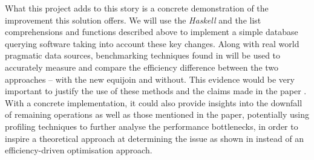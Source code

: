  What this project adds to this story is a concrete demonstration of the improvement this solution offers.
 We will use the \emph{Haskell} and the list comprehensions and functions described above to implement a simple database querying software taking into account these key changes. Along with real world pragmatic data sources, benchmarking techniques found in  will be used to accurately measure and compare the efficiency difference between the two approaches -- with the new equijoin and without. This evidence would be very important to justify the use of these methods and the claims made in the paper \cite{RelationalAlgebraByWayOfAdjunctions}.
 With a concrete implementation, it could also provide insights into the downfall of remaining operations as well as those mentioned in the paper, potentially using profiling techniques to further analyse the performance bottlenecks, in order to inspire a theoretical approach at determining the issue as shown in \cite{RelationalAlgebraByWayOfAdjunctions} instead of an efficiency-driven optimisation approach.
